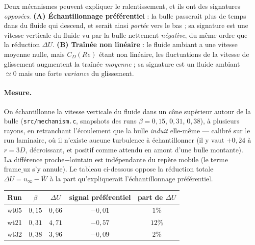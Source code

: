 Deux mécanismes peuvent expliquer le ralentissement, et ils ont des signatures
\emph{opposées}. \textbf{(A) Échantillonnage préférentiel} : la bulle passerait plus de
temps dans du fluide qui descend, et serait ainsi \emph{portée} vers le bas ; sa
signature est une vitesse verticale du fluide vu par la bulle nettement \emph{négative},
du même ordre que la réduction $\Delta U$. \textbf{(B) Traînée non linéaire}
\cite{liu2024} : le fluide ambiant a une vitesse moyenne nulle, mais $C_D(Re)$ étant
non linéaire, les fluctuations de la vitesse de glissement augmentent la traînée
\emph{moyenne} ; sa signature est un fluide ambiant $\simeq0$ mais une forte
\emph{variance} du glissement.

\paragraph{Mesure.} On échantillonne la vitesse verticale du fluide dans un cône
supérieur autour de la bulle (\texttt{src/mechanism.c}, snapshots des runs
$\beta=0{,}15$, $0{,}31$, $0{,}38$), à plusieurs rayons, en retranchant l'écoulement que
la bulle \emph{induit} elle-même --- calibré sur le run laminaire, où il n'existe aucune
turbulence à échantillonner (il y vaut $+0{,}24$ à $r=3D$, décroissant, et positif comme
attendu en amont d'une bulle montante). La différence proche$-$lointain est indépendante
du repère mobile (le terme $\mathrm{frame\_uz}$ s'y annule). Le tableau ci-dessous oppose
la réduction totale $\Delta U = u_\infty - \overline{W}$ à la part qu'expliquerait
l'échantillonnage préférentiel.

\begin{center}
\renewcommand{\arraystretch}{1.25}
\begin{tabular}{lcccc}
    \toprule
    Run & $\beta$ & $\Delta U$ & signal préférentiel & part de $\Delta U$ \\
    \midrule
    wt05 & $0{,}15$ & $0{,}66$ & $-0{,}01$ & $1\%$ \\
    wt21 & $0{,}31$ & $4{,}71$ & $-0{,}57$ & $12\%$ \\
    wt32 & $0{,}38$ & $3{,}96$ & $-0{,}09$ & $2\%$ \\
    \bottomrule
\end{tabular}
\end{center}

